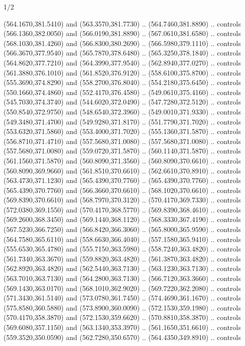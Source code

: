 \begin{flagdescription}{1/2}
\begin{scope}[xshift=0.5\flaglength,yshift=0.5\flagwidth,scale=\flagwidth/759]
\begin{scope}[y=0.8pt, x=0.8pt, yscale=-1,shift={(-720,-480)}]
\begin{scope}[cm={{1.14637,0.0,0.0,1.17117,(33.17849,82.1384)}}]
  (564.1670,381.5410) and (563.3570,381.7730) .. (564.7460,381.8890) .. controls
  (566.1360,382.0050) and (566.0190,381.8890) .. (567.0610,381.6580) .. controls
  (568.1030,381.4260) and (566.8300,380.2690) .. (566.5980,379.1110) .. controls
  (566.3670,377.9540) and (565.7870,378.6480) .. (565.3250,378.1840) .. controls
  (564.8620,377.7210) and (564.3990,377.9540) .. (562.8940,377.0270) .. controls
  (561.3880,376.1010) and (561.8520,376.9120) .. (558.6100,375.8700) .. controls
  (555.3690,374.8290) and (558.2700,376.8040) .. (554.2180,375.6450) .. controls
  (550.1660,374.4860) and (552.4170,376.4580) .. (549.0610,375.4160) .. controls
  (545.7030,374.3740) and (544.6020,372.0490) .. (547.7280,372.5120) .. controls
  (550.8540,372.9750) and (548.6540,372.3960) .. (549.0010,371.9330) .. controls
  (549.3480,371.4700) and (549.9280,371.8170) .. (551.7790,371.7020) .. controls
  (553.6320,371.5860) and (553.4000,371.7020) .. (555.1360,371.5870) .. controls
  (556.8710,371.4710) and (557.5680,371.0080) .. (557.5680,371.0080) .. controls
  (557.5680,371.0080) and (559.0720,371.5870) .. (560.1140,371.5870) .. controls
  (561.1560,371.5870) and (560.8090,371.3560) .. (560.8090,370.6610) .. controls
  (560.8090,369.9660) and (561.8510,370.6610) .. (562.6610,370.8910) .. controls
  (563.4730,371.1230) and (565.4390,370.7760) .. (565.4390,370.7760) .. controls
  (565.4390,370.7760) and (566.3660,370.6610) .. (568.1020,370.6610) .. controls
  (569.8390,370.6610) and (568.7970,370.3120) .. (570.4170,369.7330) .. controls
  (572.0380,369.1550) and (570.4170,368.5770) .. (569.8390,368.4610) .. controls
  (569.2600,368.3450) and (569.1440,368.1120) .. (568.3330,367.4190) .. controls
  (567.5230,366.7250) and (566.8420,366.3060) .. (565.8000,365.9590) .. controls
  (564.7580,365.6110) and (558.6630,366.4040) .. (557.1580,365.9410) .. controls
  (555.6530,365.4780) and (555.7150,363.5980) .. (558.7240,363.4820) .. controls
  (561.7340,363.3670) and (559.8820,363.4820) .. (561.3870,363.4820) .. controls
  (562.8920,363.4820) and (562.5440,363.7130) .. (563.1230,363.7130) .. controls
  (563.7010,363.7130) and (564.2800,363.7130) .. (566.7120,363.3660) .. controls
  (569.1430,363.0170) and (568.1010,362.9020) .. (569.7220,362.2080) .. controls
  (571.3430,361.5140) and (573.0780,361.7450) .. (574.4690,361.1670) .. controls
  (575.8580,360.5880) and (573.8900,360.0090) .. (572.1530,359.1980) .. controls
  (570.4170,358.3870) and (572.1530,359.6620) .. (570.8810,358.3870) .. controls
  (569.6080,357.1150) and (563.1340,353.3970) .. (561.1650,351.6610) .. controls
  (559.3520,350.0590) and (562.7280,350.6570) .. (564.4350,349.8910) .. controls

\end{scope}
\end{scope}
\end{scope}
\end{flagdescription}
